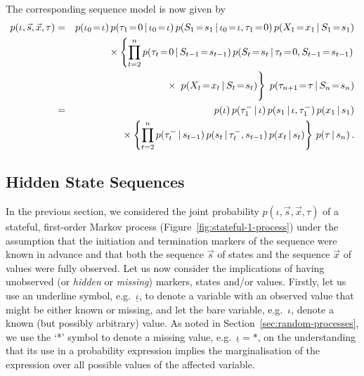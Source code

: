 \documentclass[a4paper]{article}
\newcommand{\ui}{\underline{\iota}}
\begin{document}
The corresponding sequence model is now given by
\begin{eqnarray}
p({\iota},\vec{s},\vec{x},{\tau}) & = & 
p(\iota_0\!=\!{\iota})\,p(\tau_1\!=\!0\,|\,\iota_0\!=\!{\iota})
\,p(S_1\!=\!s_1\,|\,\iota_0\!=\!{\iota},\tau_1\!=\!0)
\,p(X_1\!=\!x_1\,|\,S_1\!=\!s_1)
\nonumber\\&&
{}\times\left\{\prod_{t=2}^{n}p(\tau_t\!=\!0\,|\,S_{t-1}\!=\!s_{t-1})
\,p(S_t\!=\!s_t\,|\,\tau_t\!=\!0,S_{t-1}\!=\!s_{t-1})\right.
\nonumber\\&&\hspace*{10mm}{}\times\left.\rule{0pt}{6mm}
\,p(X_t\!=\!x_t\,|\,S_t\!=\!s_t)\right\}
\;p(\tau_{n+1}\!=\!{\tau}\,|\,S_n\!=\!s_n)
\nonumber\\
&=&
p({\iota})\,p(\tau^-_1\,|\,{\iota})
\,p(s_1\,|\,{\iota},\tau^-_1)
\,p(x_1\,|\,s_1)
\nonumber\\&&
{}\times\left\{\prod_{t=2}^{n}p(\tau^-_t\,|\,s_{t-1})
\,p(s_t\,|\,\tau^-_t,s_{t-1})\,p(x_t\,|\,s_t)\right\}
\,p({\tau}\,|\,s_n)
\,.
\label{eq:stateful-1-model}
\end{eqnarray}

\subsection{Hidden State Sequences}\label{sec:hidden-state}

In the previous section, we considered the joint probability $p({\iota},\vec{s},\vec{x},{\tau})$ of a stateful, first-order Markov process (Figure~\ref{fig:stateful-1-process}) under the assumption that the initiation and termination markers of the sequence were known in advance and that
both the sequence $\vec{s}$ of states and the sequence $\vec{x}$ of values were fully observed.
Let us now consider the implications of having unobserved (or {\em hidden} or {\em missing}) markers, states and/or values.
Firstly, let us use an underline symbol, e.g.\ $\ui$, to denote a variable with an observed value that might be either known or missing, and let the bare variable, e.g.\
$\iota$, denote a known (but possibly arbitrary) value. As noted in Section~\ref{sec:random-processes}, we use the `*' symbol to denote a missing value, e.g.\ $\ui=*$,
on the understanding that its use in a probability expression implies the marginalisation of the expression over all possible values of the affected variable.
\end{document}
